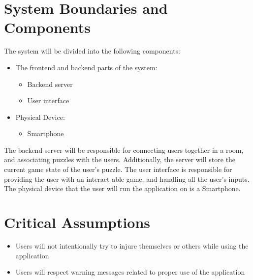 \documentclass{article}
\begin{document}

\section{System Boundaries and Components}

The system will be divided into the following components:
\begin{itemize}
    \item The frontend and backend parts of the system:
    \begin{itemize}
        \item Backend server
        \item User interface
    \end{itemize}
    \item Physical Device:
        \begin{itemize}
            \item Smartphone
        \end{itemize}
\end{itemize}

The backend server will be responsible for connecting users together in a room, and associating puzzles with the users. Additionally, the server will store the current game state of the user's puzzle. The user interface is responsible for providing the user with an interact-able game, and handling all the user's inputs. The physical device that the user will run the application on is a Smartphone.

\section{Critical Assumptions}
\begin{itemize}
    \item Users will not intentionally try to injure themselves or others while using the application
    \item Users will respect warning messages related to proper use of the application
\end{itemize}
\end{document}
